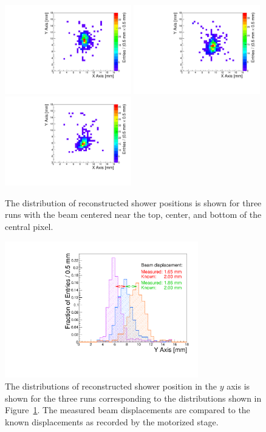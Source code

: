 \documentclass[12pt]{article}
\begin{document}
\begin{figure}[htbp] \centering
\includegraphics[width=0.49\textwidth]{Images/centers/run30dist.pdf}
\includegraphics[width=0.49\textwidth]{Images/centers/run32dist.pdf}
\includegraphics[width=0.49\textwidth]{Images/centers/run34dist.pdf}
\caption{The distribution of reconstructed shower positions is shown for three
runs with the beam centered near the top, center, and bottom of the central
pixel. } \label{fig:EMShowerPositions} \end{figure} \begin{figure}[htbp]

\centering
\includegraphics[width=0.75\textwidth]{Images/centers/superimposed.pdf}
\caption{The distributions of reconstructed shower position in the $y$ axis is
shown for the three runs corresponding to the distributions shown in
Figure~\ref{fig:EMShowerPositions}. The measured beam displacements are compared
to the known displacements as recorded by the motorized stage. }
\label{fig:EMShowerYPositionComparison} 
\end{figure} 
\end{document}

